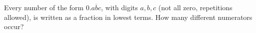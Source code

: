 Every number of the form $0.\overline{abc}$, with digits $a,b,c$ (not all zero, repetitions allowed), is written as a fraction in lowest terms. How many different numerators occur?
